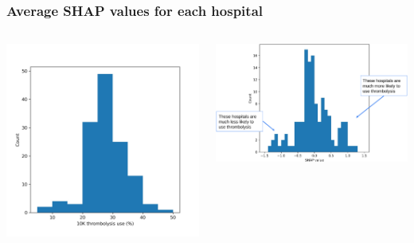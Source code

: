 \documentclass[xcolor={usenames,dvipsnames}]{beamer}
\begin{document}
\begin{frame}
\frametitle{Average SHAP values for each hospital}


\begin{columns}

    \vspace{0.5em}
    \begin{center} 
    \includegraphics[width=\textwidth, trim={0em 0em 0em 4em}, clip]{./images/predicted_thrombolysis_use}
    \end{center} 
    
    \begin{center} 
    \includegraphics[width=\textwidth]{./images/shap_average_per_hospital_annotated}
    \end{center}



\end{columns}
\end{frame}
\end{document}
